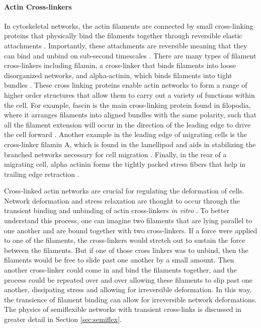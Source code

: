 \paragraph{Actin Cross-linkers}  In cytoskeletal networks, the actin filaments are connected by small cross-linking proteins that physically bind the filaments together through reversible elastic attachments \cite{B912163N}. Importantly, these attachments are reversible meaning that they can bind and unbind on sub-second timescales \cite{B912163N}.  There are many types of filament cross-linkers including filamin, a cross-linker that  binds filaments into loose disorganized networks, and alpha-actinin, which  binds filaments into tight bundles \cite{B912163N}.  These cross linking proteins enable actin networks to form a range of higher order structures that allow them to carry out a variety of functions within the cell.  For example, fascin is the main cross-linking protein found in filopodia, where it arranges filaments into aligned bundles with the same polarity, such that all the filament extension will occur in the direction of the leading edge to drive the cell forward \cite{Ross2000658}. Another example in the leading edge of migrating cells is the cross-linker filamin A, which is found in the lamellipod and aids in stabilizing the branched networks necessary for cell migration \cite{Cunningham325}. Finally, in the rear of a migrating cell, alpha actinin forms the tightly packed stress fibers that help in trailing edge retraction \cite{Zaidel-Bar2007}.  

Cross-linked actin networks are crucial for regulating the deformation of cells.  Network deformation and stress relaxation are thought to occur through the transient binding and unbinding of actin cross-linkers \cite{Ahmed26052015} \textit{in vitro} \cite{PhysRevLett.101.108101}.  To better understand this process, one can imagine two filaments that are lying parallel to one another and are bound together with two cross-linkers.  If a force were applied to one of the filaments, the cross-linkers would stretch out to sustain the force between the filaments.  But if one of those cross linkers was to unbind, then the filaments would be free to slide past one another by a small amount.  Then another cross-linker could come in and bind the filaments together, and the process could be repeated over and over allowing these filaments to slip past one another, dissipating stress and allowing for irreversible deformation.  In this way, the transience of filament binding can allow for irreversible network deformations.  The physics of semiflexible networks with transient cross-links is discussed in greater detail in Section \ref{sec:semiflex}.


